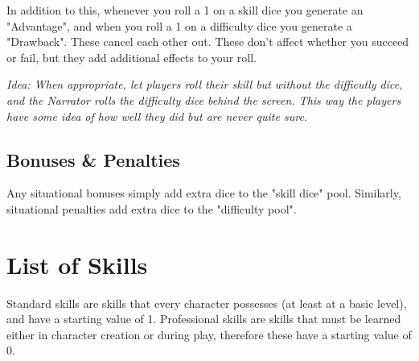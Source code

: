 In addition to this, whenever you roll a 1 on a skill dice you generate an "Advantage", and when you roll a 1 on a difficulty dice you generate a "Drawback". These cancel each other out. These don't affect whether you succeed or fail, but they add additional effects to your roll.

\textit{
    Idea: When appropriate, let players roll their skill but without the difficutly dice, and the Narrator rolls the difficulty dice behind the screen. This way the players have some idea of how well they did but are never quite sure.
}

\subsection{Bonuses \& Penalties}
Any situational bonuses simply add extra dice to the "skill dice" pool. 
Similarly, situational penalties add extra dice to the "difficulty pool".


\section{List of Skills}

Standard skills are skills that every character possesses (at least at a basic level),
and have a starting value of 1. 
Professional skills are skills that must be learned either in character creation or during play,
therefore these have a starting value of 0. 



